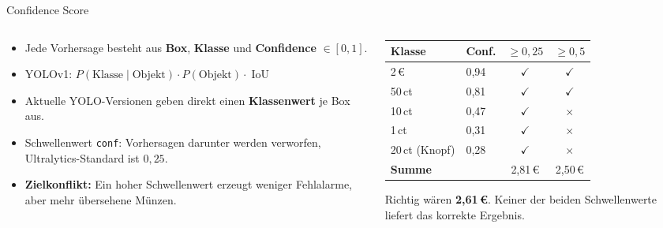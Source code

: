 \begin{frame}{Confidence Score}
\footnotesize
\begin{columns}
\begin{column}{0.47\textwidth}
\begin{itemize}
  \item Jede Vorhersage besteht aus \textbf{Box}, \textbf{Klasse} und \textbf{Confidence} $\in [0, 1]$.
  \item YOLOv1: $P(\text{Klasse} \mid \text{Objekt}) \cdot P(\text{Objekt}) \cdot \operatorname{IoU}$
  \item Aktuelle YOLO-Versionen geben direkt einen \textbf{Klassenwert} je Box aus.
  \item Schwellenwert \texttt{conf}: Vorhersagen darunter werden verworfen, Ultralytics-Standard ist $0{,}25$.
  \item \textbf{Zielkonflikt:} Ein hoher Schwellenwert erzeugt weniger Fehlalarme, aber mehr übersehene Münzen.
\end{itemize}
\end{column}
\begin{column}{0.48\textwidth}
\centering
\begin{tabular}{llcc}
\toprule
\textbf{Klasse} & \textbf{Conf.} & $\geq 0{,}25$ & $\geq 0{,}5$ \\
\midrule
2\,€  & 0,94 & $\checkmark$ & $\checkmark$ \\
50\,ct & 0,81 & $\checkmark$ & $\checkmark$ \\
10\,ct & 0,47 & $\checkmark$ & $\times$ \\
1\,ct  & 0,31 & $\checkmark$ & $\times$ \\
20\,ct (Knopf) & 0,28 & $\checkmark$ & $\times$ \\
\midrule
\textbf{Summe} & & 2,81\,€ & 2,50\,€ \\
\bottomrule
\end{tabular}

\vspace{0.8em}
Richtig wären \textbf{2,61\,€}. Keiner der beiden Schwellenwerte liefert das korrekte Ergebnis.
\end{column}
\end{columns}
\end{frame}

